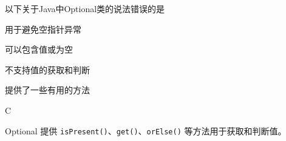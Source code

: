 \begin{question}
	以下关于Java中Optional类的说法错误的是
	\begin{options}
		\item 用于避免空指针异常
		\item 可以包含值或为空
		\item 不支持值的获取和判断
		\item 提供了一些有用的方法
	\end{options}
	\begin{answer}
		C
	\end{answer}
	\begin{explanation}
		Optional 提供 \texttt{isPresent()}、\texttt{get()}、\texttt{orElse()} 等方法用于获取和判断值。
	\end{explanation}
\end{question}
